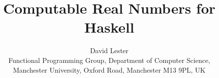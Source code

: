 \newtheorem{theorem}{Theorem}[section]
\newtheorem{definition}[theorem]{Definition}
\newtheorem{example}[theorem]{Example}
\newtheorem{counterexample}[theorem]{Counter Example}
\newtheorem{lemma}[theorem]{Lemma}
\newtheorem{hypothesis}[theorem]{Hypothesis}
\newtheorem{proposition}[theorem]{Proposition}
\newtheorem{corollary}[theorem]{Corollary}



%
%
\def\fpstate{Draft}
\def\fprevision{1.1}
\def\fpdate{94/06/15} \def\fptime{11:50:41}

\def\indexTT#1{}
\def\indexDTT#1{}


\title[Computable Reals]{Computable Real Numbers for {\sc Haskell}}
\author[David Lester]{David Lester\\Functional Programming Group,
Department of Computer Science,\\ Manchester University, Oxford Road,
Manchester M13 9PL, UK}

